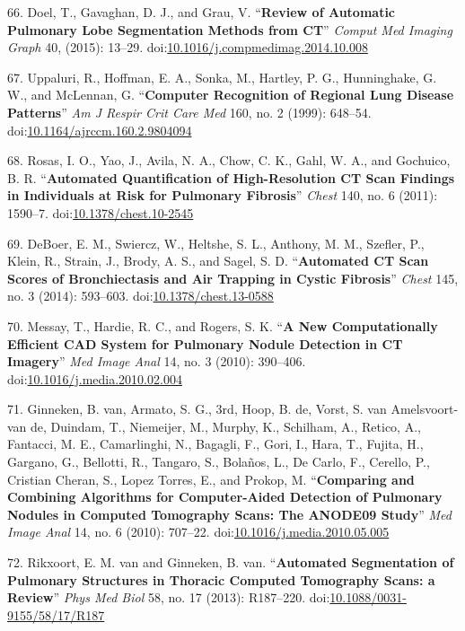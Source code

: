 \documentclass[11pt,]{article}
\begin{document}
66. Doel, T., Gavaghan, D. J., and Grau, V. ``\textbf{Review of
Automatic Pulmonary Lobe Segmentation Methods from CT}'' \emph{Comput
Med Imaging Graph} 40, (2015): 13--29.
doi:\href{http://dx.doi.org/10.1016/j.compmedimag.2014.10.008}{10.1016/j.compmedimag.2014.10.008}

67. Uppaluri, R., Hoffman, E. A., Sonka, M., Hartley, P. G.,
Hunninghake, G. W., and McLennan, G. ``\textbf{Computer Recognition of
Regional Lung Disease Patterns}'' \emph{Am J Respir Crit Care Med} 160,
no. 2 (1999): 648--54.
doi:\href{http://dx.doi.org/10.1164/ajrccm.160.2.9804094}{10.1164/ajrccm.160.2.9804094}

68. Rosas, I. O., Yao, J., Avila, N. A., Chow, C. K., Gahl, W. A., and
Gochuico, B. R. ``\textbf{Automated Quantification of High-Resolution CT
Scan Findings in Individuals at Risk for Pulmonary Fibrosis}''
\emph{Chest} 140, no. 6 (2011): 1590--7.
doi:\href{http://dx.doi.org/10.1378/chest.10-2545}{10.1378/chest.10-2545}

69. DeBoer, E. M., Swiercz, W., Heltshe, S. L., Anthony, M. M., Szefler,
P., Klein, R., Strain, J., Brody, A. S., and Sagel, S. D.
``\textbf{Automated CT Scan Scores of Bronchiectasis and Air Trapping in
Cystic Fibrosis}'' \emph{Chest} 145, no. 3 (2014): 593--603.
doi:\href{http://dx.doi.org/10.1378/chest.13-0588}{10.1378/chest.13-0588}

70. Messay, T., Hardie, R. C., and Rogers, S. K. ``\textbf{A New
Computationally Efficient CAD System for Pulmonary Nodule Detection in
CT Imagery}'' \emph{Med Image Anal} 14, no. 3 (2010): 390--406.
doi:\href{http://dx.doi.org/10.1016/j.media.2010.02.004}{10.1016/j.media.2010.02.004}

71. Ginneken, B. van, Armato, S. G., 3rd, Hoop, B. de, Vorst, S. van
Amelsvoort-van de, Duindam, T., Niemeijer, M., Murphy, K., Schilham, A.,
Retico, A., Fantacci, M. E., Camarlinghi, N., Bagagli, F., Gori, I.,
Hara, T., Fujita, H., Gargano, G., Bellotti, R., Tangaro, S., Bola{ñ}os,
L., De Carlo, F., Cerello, P., Cristian Cheran, S., Lopez Torres, E.,
and Prokop, M. ``\textbf{Comparing and Combining Algorithms for
Computer-Aided Detection of Pulmonary Nodules in Computed Tomography
Scans: The ANODE09 Study}'' \emph{Med Image Anal} 14, no. 6 (2010):
707--22.
doi:\href{http://dx.doi.org/10.1016/j.media.2010.05.005}{10.1016/j.media.2010.05.005}

72. Rikxoort, E. M. van and Ginneken, B. van. ``\textbf{Automated
Segmentation of Pulmonary Structures in Thoracic Computed Tomography
Scans: a Review}'' \emph{Phys Med Biol} 58, no. 17 (2013): R187--220.
doi:\href{http://dx.doi.org/10.1088/0031-9155/58/17/R187}{10.1088/0031-9155/58/17/R187}
\end{document}
